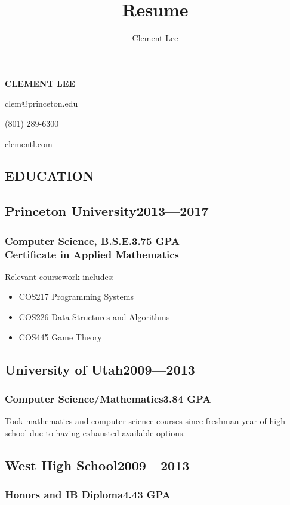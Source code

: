 \documentclass[11pt]{article}
\author{Clement Lee}
\title{Resume}
\begin{document}

{\huge\textbf{CLEMENT LEE}}
\vspace{0.25\baselineskip}

clem@princeton.edu

(801) 289-6300

clementl.com

\vspace{\baselineskip}
\begin{multicols}{2}
\section*{EDUCATION}
\subsection*{Princeton University\hfill\textnormal{2013---2017}}
\subsubsection*{Computer Science, B.S.E.\hfill\textnormal{3.75 GPA}\\
Certificate in Applied Mathematics}

Relevant coursework includes:
\begin{itemize}[noitemsep,nolistsep,leftmargin=*]
\item COS217 Programming Systems
\item COS226 Data Structures and Algorithms
\item COS445 Game Theory
\end{itemize}

\subsection*{University of Utah\hfill\textnormal{2009---2013}}
\subsubsection*{Computer Science/Mathematics\hfill\textnormal{3.84 GPA}}
Took mathematics and computer science courses since freshman year of high school due to having exhausted available options.

\subsection*{West High School\hfill\textnormal{2009---2013}}
\subsubsection*{Honors and IB Diploma\hfill\textnormal{4.43 GPA}}
\vspace{1.5\baselineskip}


\end{multicols}
\end{document}
